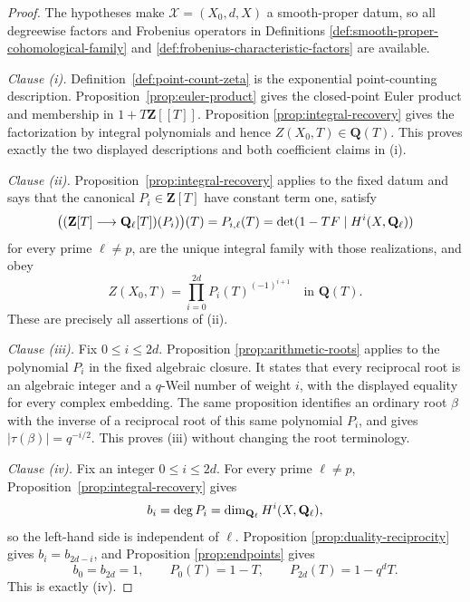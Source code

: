 \begin{proof}

The hypotheses make \(\mathscr X=(X_0,d,X)\) a smooth-proper datum, so all
degreewise factors and Frobenius operators in Definitions
\ref{def:smooth-proper-cohomological-family} and
\ref{def:frobenius-characteristic-factors} are available.

\smallskip
\noindent\emph{Clause \textup{(i)}.}
Definition~\ref{def:point-count-zeta} is the exponential point-counting
description.  Proposition~\ref{prop:euler-product} gives the closed-point
Euler product and membership in \(1+T\mathbf Z[[T]]\).  Proposition
\ref{prop:integral-recovery} gives the factorization by integral
polynomials and hence \(Z(X_0,T)\in\mathbf Q(T)\).
This proves exactly the two displayed descriptions and both coefficient
claims in \textup{(i)}.

\smallskip
\noindent\emph{Clause \textup{(ii)}.}
Proposition~\ref{prop:integral-recovery} applies to the fixed datum and says
that the canonical \(P_i\in\mathbf Z[T]\) have constant term one, satisfy
\[
 \bigl((\mathbf Z[T]\longrightarrow\mathbf Q_{\ell}[T])(P_i)\bigr)(T)=P_{i,\ell}(T)
 =\det(1-TF\mid H^i(X,\mathbf Q_{\ell}))
\]
for every prime \(\ell\neq p\), are the unique integral family with those
realizations, and obey
\[
 Z(X_0,T)=\prod_{i=0}^{2d}P_i(T)^{(-1)^{i+1}}
 \quad\text{in }\mathbf Q(T).
\]
These are precisely all assertions of \textup{(ii)}.

\smallskip
\noindent\emph{Clause \textup{(iii)}.}
Fix \(0\leq i\leq2d\).  Proposition
\ref{prop:arithmetic-roots} applies to the polynomial \(P_i\) in the fixed
algebraic closure.  It states that every reciprocal root is an algebraic
integer and a \(q\)-Weil number of weight \(i\), with the displayed equality
for every complex embedding.  The same proposition identifies an ordinary
root \(\beta\) with the inverse of a reciprocal root of this same
polynomial \(P_i\), and gives \(|\tau(\beta)|=q^{-i/2}\).  This proves
\textup{(iii)} without changing the root terminology.

\smallskip
\noindent\emph{Clause \textup{(iv)}.}
Fix an integer \(0\leq i\leq2d\).  For every prime \(\ell\neq p\),
Proposition~\ref{prop:integral-recovery} gives
\[
 b_i=\deg P_i=\dim_{\mathbf Q_{\ell}}H^i(X,\mathbf Q_{\ell}),
\]
so the left-hand side is independent of \(\ell\).  Proposition
\ref{prop:duality-reciprocity} gives \(b_i=b_{2d-i}\), and Proposition
\ref{prop:endpoints} gives
\[
 b_0=b_{2d}=1,\qquad P_0(T)=1-T,\qquad P_{2d}(T)=1-q^dT.
\]
This is exactly \textup{(iv)}.


\end{proof}
